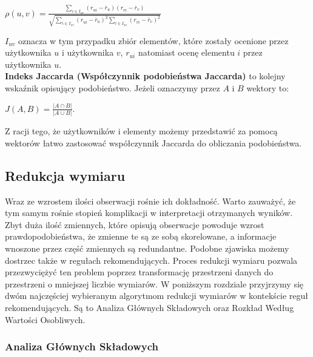 \documentclass[12pt,a4paper]{report}
\begin{document}
\begin{center}
$\rho(u,v) = \frac{\sum_{i\in I_{uv}}(r_{ui}-\overline{r}_u)(r_{vi}-\overline{r}_v)}{\sqrt{\sum_{i\in I_{uv}}(r_{ui}-\overline{r}_u)^2 \sum_{i\in I_{uv}}(r_{vi}-\overline{r}_v)^2}}$
\end{center}
$I_{uv}$ oznacza w tym przypadku zbiór elementów, które zostały ocenione przez użytkownika $u$ i użytkownika $v$, $r_{ui}$ natomiast ocenę elementu $i$ przez użytkownika $u$.
\\\textbf{Indeks Jaccarda (Współczynnik podobieństwa Jaccarda)} to kolejny wskaźnik opisujący podobieństwo. Jeżeli oznaczymy przez $A$ i $B$ wektory to:
\begin{center}
$J(A,B)=\frac{|A\cap B|}{|A \cup B|}$.
\end{center}
Z racji tego, że użytkowników i elementy możemy przedstawić za pomocą wektorów łatwo zastosować współczynnik Jaccarda do obliczania podobieństwa.

\subsection{Redukcja wymiaru}
Wraz ze wzrostem ilości obserwacji rośnie ich dokładność. Warto zauważyć, że tym samym rośnie stopień komplikacji w interpretacji otrzymanych wyników. Zbyt duża ilość zmiennych, które opisują obserwacje powoduje wzrost prawdopodobieństwa, że zmienne te są ze sobą skorelowane, a informacje wnoszone przez część zmiennych są redundantne. Podobne zjawiska możemy dostrzec także w regułach rekomendujących. Proces redukcji wymiaru pozwala przezwyciężyć ten problem poprzez transformację przestrzeni danych do przestrzeni o mniejszej liczbie wymiarów. W poniższym rozdziale przyjrzymy się dwóm najczęściej wybieranym algorytmom redukcji wymiarów w kontekście reguł rekomendujących. Są to Analiza Głównych Składowych oraz Rozkład Według Wartości Osobliwych.

\subsubsection{Analiza Głównych Składowych}
\end{document}
